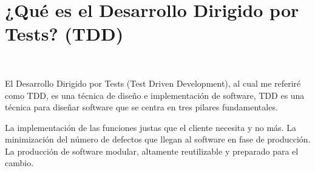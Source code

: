 \section{¿Qué es el Desarrollo Dirigido por Tests? (TDD)} 
\textbf{}\\
\begin{flushleft}


\begin{itemize}
El Desarrollo Dirigido por Tests (Test Driven Development), al cual me referiré como TDD, es una técnica de diseño e implementación de software,
TDD es una técnica para diseñar software que se centra en tres pilares fundamentales.

La implementación de las funciones justas que el cliente necesita y no más.
La minimización del número de defectos que llegan al software en fase de producción.
La producción de software modular, altamente reutilizable y preparado para el cambio.



	


\end{itemize} 


\end{flushleft}